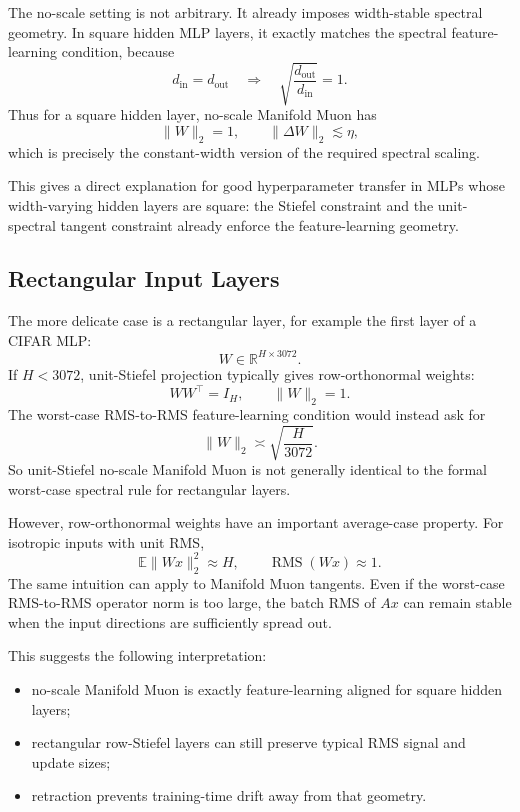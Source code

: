 \documentclass[12pt]{article}
\newcommand{\R}{\mathbb{R}}
\newcommand{\rms}{\operatorname{RMS}}
\newcommand{\fanin}{d_{\mathrm{in}}}
\newcommand{\fanout}{d_{\mathrm{out}}}
\begin{document}
The no-scale setting is not arbitrary. It already imposes width-stable
spectral geometry. In square hidden MLP layers, it exactly matches the spectral
feature-learning condition, because
\[
    \fanin = \fanout
    \quad\Longrightarrow\quad
    \sqrt{\frac{\fanout}{\fanin}} = 1.
\]
Thus for a square hidden layer, no-scale Manifold Muon has
\[
    \|W\|_2 = 1,
    \qquad
    \|\Delta W\|_2 \lesssim \eta,
\]
which is precisely the constant-width version of the required spectral scaling.

This gives a direct explanation for good hyperparameter transfer in MLPs whose
width-varying hidden layers are square: the Stiefel constraint and the
unit-spectral tangent constraint already enforce the feature-learning
geometry.

\subsection{Rectangular Input Layers}

The more delicate case is a rectangular layer, for example the first layer of a
CIFAR MLP:
\[
    W \in \R^{H \times 3072}.
\]
If $H < 3072$, unit-Stiefel projection typically gives row-orthonormal weights:
\[
    WW^\top = I_H,
    \qquad
    \|W\|_2 = 1.
\]
The worst-case RMS-to-RMS feature-learning condition would instead ask for
\[
    \|W\|_2
    \asymp
    \sqrt{\frac{H}{3072}}.
\]
So unit-Stiefel no-scale Manifold Muon is not generally identical to the
formal worst-case spectral rule for rectangular layers.

However, row-orthonormal weights have an important average-case property. For
isotropic inputs with unit RMS,
\[
    \mathbb{E}\|Wx\|_2^2 \approx H,
    \qquad
    \rms(Wx) \approx 1.
\]
The same intuition can apply to Manifold Muon tangents. Even if the worst-case
RMS-to-RMS operator norm is too large, the batch RMS of $Ax$ can remain stable
when the input directions are sufficiently spread out.

This suggests the following interpretation:
\begin{itemize}
    \item no-scale Manifold Muon is exactly feature-learning aligned for square
    hidden layers;
    \item rectangular row-Stiefel layers can still preserve typical RMS signal
    and update sizes;
    \item retraction prevents training-time drift away from that geometry.
\end{itemize}
\end{document}
